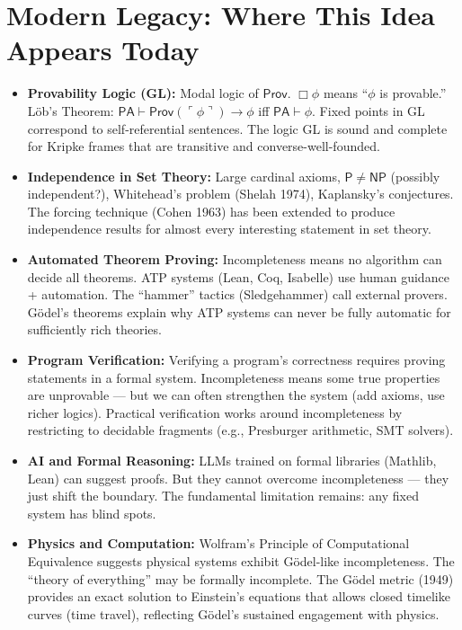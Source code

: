 \section{Modern Legacy: Where This Idea Appears Today}
\label{sec:godel:legacy}

\begin{itemize}
\item \textbf{Provability Logic (GL):} Modal logic of $\mathsf{Prov}$. $\Box \phi$ means ``$\phi$ is provable.'' Löb's Theorem: $\mathsf{PA} \vdash \mathsf{Prov}(\ulcorner \phi \urcorner) \to \phi$ iff $\mathsf{PA} \vdash \phi$. Fixed points in GL correspond to self-referential sentences. The logic GL is sound and complete for Kripke frames that are transitive and converse-well-founded.

\item \textbf{Independence in Set Theory:} Large cardinal axioms, $\mathsf{P} \neq \mathsf{NP}$ (possibly independent?), Whitehead's problem (Shelah 1974), Kaplansky's conjectures. The forcing technique (Cohen 1963) has been extended to produce independence results for almost every interesting statement in set theory.

\item \textbf{Automated Theorem Proving:} Incompleteness means no algorithm can decide all theorems. ATP systems (Lean, Coq, Isabelle) use human guidance + automation. The ``hammer'' tactics (Sledgehammer) call external provers. Gödel's theorems explain why ATP systems can never be fully automatic for sufficiently rich theories.

\item \textbf{Program Verification:} Verifying a program's correctness requires proving statements in a formal system. Incompleteness means some true properties are unprovable --- but we can often strengthen the system (add axioms, use richer logics). Practical verification works around incompleteness by restricting to decidable fragments (e.g., Presburger arithmetic, SMT solvers).

\item \textbf{AI and Formal Reasoning:} LLMs trained on formal libraries (Mathlib, Lean) can suggest proofs. But they cannot overcome incompleteness --- they just shift the boundary. The fundamental limitation remains: any fixed system has blind spots.

\item \textbf{Physics and Computation:} Wolfram's Principle of Computational Equivalence suggests physical systems exhibit Gödel-like incompleteness. The ``theory of everything'' may be formally incomplete. The Gödel metric (1949) provides an exact solution to Einstein's equations that allows closed timelike curves (time travel), reflecting Gödel's sustained engagement with physics.


\end{itemize}
